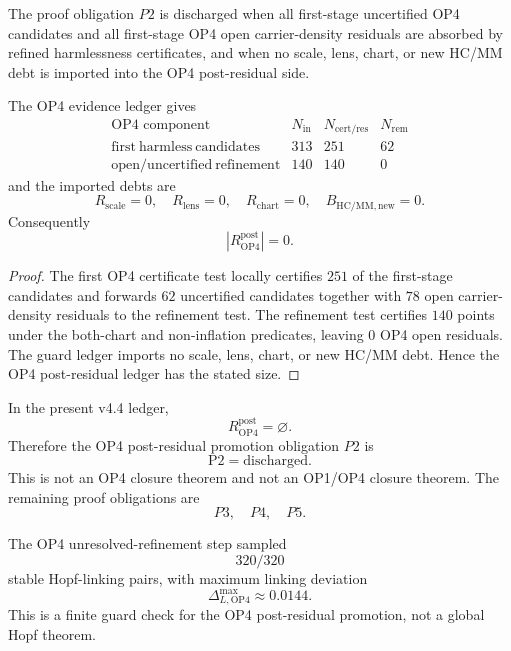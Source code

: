 \begin{definition}
The proof obligation \(P2\) is discharged when all first-stage uncertified
OP4 candidates and all first-stage OP4 open carrier-density residuals are
absorbed by refined harmlessness certificates, and when no scale, lens, chart,
or new HC/MM debt is imported into the OP4 post-residual side.
\end{definition}

\begin{proposition}
The OP4 evidence ledger gives
\[
\begin{array}{c|r|r|r}
\text{OP4 component} & N_{\mathrm{in}} & N_{\mathrm{cert/res}} &
N_{\mathrm{rem}}\\
\hline
\mathrm{first\ harmless\ candidates} & 313 & 251 & 62\\
\mathrm{open/uncertified\ refinement} & 140 & 140 & 0
\end{array}
\]
and the imported debts are
\[
    R_{\mathrm{scale}}=0,\quad
    R_{\mathrm{lens}}=0,\quad
    R_{\mathrm{chart}}=0,\quad
    B_{\mathrm{HC/MM,new}}=0.
\]
Consequently
\[
    |R_{\mathrm{OP4}}^{\mathrm{post}}|=0.
\]
\end{proposition}

\begin{proof}
The first OP4 certificate test locally certifies \(251\) of the
first-stage candidates and forwards \(62\) uncertified
candidates together with \(78\) open carrier-density residuals to
the refinement test.  The refinement test certifies \(140\) points
under the both-chart and non-inflation predicates, leaving \(0\)
OP4 open residuals.  The guard ledger imports no scale, lens, chart, or new
HC/MM debt.  Hence the OP4 post-residual ledger has the stated size.
\end{proof}

\begin{theorem}[P2 discharge]
In the present v4.4 ledger,
\[
    R_{\mathrm{OP4}}^{\mathrm{post}}=\varnothing.
\]
Therefore the OP4 post-residual promotion obligation \(P2\) is
\[
    \mathrm{P2}=\mathrm{discharged}.
\]
This is not an OP4 closure theorem and not an OP1/OP4 closure theorem.  The
remaining proof obligations are
\[
    P3,\quad P4,\quad P5.
\]
\end{theorem}

\begin{remark}
The OP4 unresolved-refinement step sampled
\[
    320/320
\]
stable Hopf-linking pairs, with maximum linking deviation
\[
    \Delta_{L,\mathrm{OP4}}^{\max}\approx 0.0144.
\]
This is a finite guard check for the OP4 post-residual promotion, not a global
Hopf theorem.
\end{remark}


